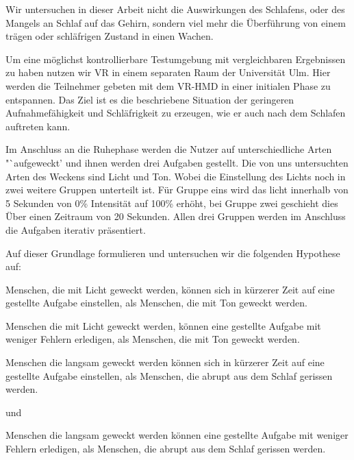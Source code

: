 Wir untersuchen in dieser Arbeit nicht die Auswirkungen des Schlafens, oder des Mangels an Schlaf auf das Gehirn, sondern viel mehr die Überführung von einem trägen oder schläfrigen Zustand in einen Wachen. 

Um eine möglichst kontrollierbare Testumgebung mit vergleichbaren Ergebnissen zu haben nutzen wir VR in einem separaten Raum der Universität Ulm. Hier werden die Teilnehmer gebeten mit dem VR-HMD in einer initialen Phase zu entspannen. Das Ziel ist es die beschriebene Situation der geringeren Aufnahmefähigkeit und Schläfrigkeit zu erzeugen, wie er auch nach dem Schlafen auftreten kann. 

Im Anschluss an die Ruhephase werden die Nutzer auf unterschiedliche Arten "`aufgeweckt' und ihnen werden drei Aufgaben gestellt. Die von uns untersuchten Arten des Weckens sind Licht und Ton. Wobei die Einstellung des Lichts noch in zwei weitere Gruppen unterteilt ist. Für Gruppe eins wird das licht innerhalb von 5 Sekunden von 0\% Intensität auf 100\% erhöht, bei Gruppe zwei geschieht dies Über einen Zeitraum von 20 Sekunden. 
Allen drei Gruppen werden im Anschluss die Aufgaben iterativ präsentiert.

Auf dieser Grundlage formulieren und untersuchen wir die folgenden Hypothese auf:

\begin{hyp}\label{hyp:lichtSchneller}
	Menschen, die mit Licht geweckt werden, können sich in kürzerer Zeit auf eine gestellte Aufgabe einstellen, als Menschen, die mit Ton geweckt werden.
\end{hyp}

\begin{hyp}\label{hyp:lichtErfolgreicher}
	Menschen die mit Licht geweckt werden, können eine gestellte Aufgabe mit weniger Fehlern erledigen, als Menschen, die mit Ton geweckt werden.
\end{hyp}

\begin{hyp}\label{hyp:langKurzSchneller}
	Menschen die langsam geweckt werden können sich in kürzerer Zeit auf eine gestellte Aufgabe einstellen, als Menschen, die abrupt aus dem Schlaf gerissen werden.
\end{hyp}

und 

\begin{hyp}\label{hyp:langKurzErfolgreicher}
	Menschen die langsam geweckt werden können eine gestellte Aufgabe mit weniger Fehlern erledigen, als Menschen, die abrupt aus dem Schlaf gerissen werden.
\end{hyp}

